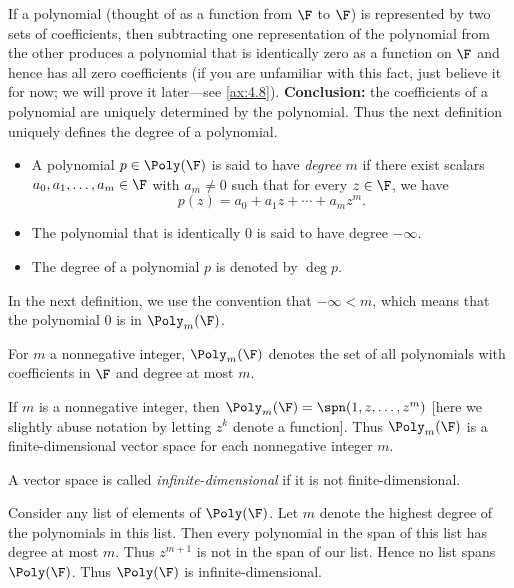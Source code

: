 If a polynomial (thought of as a function from $\F$ to $\F$) is represented by
two sets of coefficients, then subtracting one representation of the
polynomial from the other produces a polynomial that is identically zero as a
function on $\F$ and hence has all zero coefficients (if you are unfamiliar
with this fact, just believe it for now; we will prove it later---see
\ref{ax:4.8}). \textbf{Conclusion:} the coefficients of a polynomial are
uniquely determined by the polynomial. Thus the next definition uniquely
defines the degree of a polynomial.

\begin{definition}\label{ax:2.11}\leavevmode
\begin{itemize}
\item A polynomial $p\in\Poly(\F)$ is said to have \emph{degree} $m$ if there
  exist scalars $a_0,a_1,\dots,a_m\in\F$ with $a_m\ne0$ such that for every
  $z\in\F$, we have
  \[ p(z) = a_0+a_1z+\cdots+a_mz^m. \]
\item The polynomial that is identically $0$ is said to have degree $-\infty$.
\item The degree of a polynomial $p$ is denoted by $\deg p$.
\end{itemize}
\end{definition}

In the next definition, we use the convention that $-\infty<m$, which means
that the polynomial $0$ is in $\Poly_m(\F)$.

\begin{notation}[$\Poly_m(\F)$]\label{ax:2.12}
For $m$ a nonnegative integer, $\Poly_m(\F)$ denotes the set of all polynomials
with coefficients in $\F$ and degree at most $m$.
\end{notation}

If $m$ is a nonnegative integer, then $\Poly_m(\F)=\spn(1,z,\dots,z^m)$ [here
we slightly abuse notation by letting $z^k$ denote a function]. Thus
$\Poly_m(\F)$ is a finite-dimensional vector space for each nonnegative integer
$m$.

\begin{definition}\label{ax:2.13}
A vector space is called \emph{infinite-dimensional} if it is not
finite-dimensional.
\end{definition}

\begin{example}\label{ax:2.14}
Consider any list of elements of $\Poly(\F)$. Let $m$ denote the highest degree
of the polynomials in this list. Then every polynomial in the span of this list
has degree at most $m$. Thus $z^{m+1}$ is not in the span of our list. Hence no
list spans $\Poly(\F)$. Thus $\Poly(\F)$ is infinite-dimensional.
\end{example}

